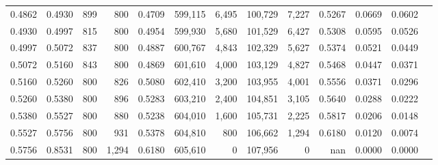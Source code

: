 \begin{tabular}{rrrrrrrrrrrrr}
0.4862 & 0.4930 &    899 &   800 &                                     0.4709 & 599,115 &   6,495 & 100,729 &   7,227 & 0.5267 & 0.0669 & 0.0602 \\
0.4930 & 0.4997 &    815 &   800 &                                     0.4954 & 599,930 &   5,680 & 101,529 &   6,427 & 0.5308 & 0.0595 & 0.0526 \\
0.4997 & 0.5072 &    837 &   800 &                                     0.4887 & 600,767 &   4,843 & 102,329 &   5,627 & 0.5374 & 0.0521 & 0.0449 \\
0.5072 & 0.5160 &    843 &   800 &                                     0.4869 & 601,610 &   4,000 & 103,129 &   4,827 & 0.5468 & 0.0447 & 0.0371 \\
0.5160 & 0.5260 &    800 &   826 &                                     0.5080 & 602,410 &   3,200 & 103,955 &   4,001 & 0.5556 & 0.0371 & 0.0296 \\
0.5260 & 0.5380 &    800 &   896 &                                     0.5283 & 603,210 &   2,400 & 104,851 &   3,105 & 0.5640 & 0.0288 & 0.0222 \\
0.5380 & 0.5527 &    800 &   880 &                                     0.5238 & 604,010 &   1,600 & 105,731 &   2,225 & 0.5817 & 0.0206 & 0.0148 \\
0.5527 & 0.5756 &    800 &   931 &                                     0.5378 & 604,810 &     800 & 106,662 &   1,294 & 0.6180 & 0.0120 & 0.0074 \\
0.5756 & 0.8531 &    800 & 1,294 &                                     0.6180 & 605,610 &       0 & 107,956 &       0 &    nan & 0.0000 & 0.0000 \\
\bottomrule
\end{tabular}

